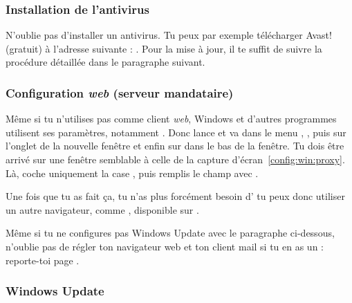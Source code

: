 


\subsubsection{Installation de l'antivirus}
\label{antivirus} 

N'oublie pas d'installer un antivirus. Tu peux par exemple télécharger Avast! (gratuit) à l'adresse suivante : . Pour la mise à jour, il te suffit de suivre la procédure détaillée dans le paragraphe suivant.

\subsubsection{Configuration \emph{web} (serveur mandataire)}


M\^eme si tu n'utilises pas  comme client \emph{web}, Windows et d'autres programmes
utilisent ses param\`etres, notamment . Donc lance  et va
dans le menu , , puis sur l'onglet  de la
nouvelle fen\^etre et enfin sur  dans le bas de la fen\^etre. Tu dois \^etre arriv\'e sur une fen\^etre semblable \`a celle de la capture d'\'ecran~\ref{config:win:proxy}. L\`a, coche
uniquement la case , puis remplis le champ
 avec .

Une fois que tu as fait \c{c}a, tu n'as plus forc\'ement besoin d' tu peux donc utiliser un autre navigateur, comme , disponible sur .

Même si tu ne configures pas Windows Update avec le paragraphe ci-dessous, n'oublie pas de régler ton navigateur web et ton client mail si tu en as un : reporte-toi page \pageref{browser}.

\subsubsection{Windows Update}

